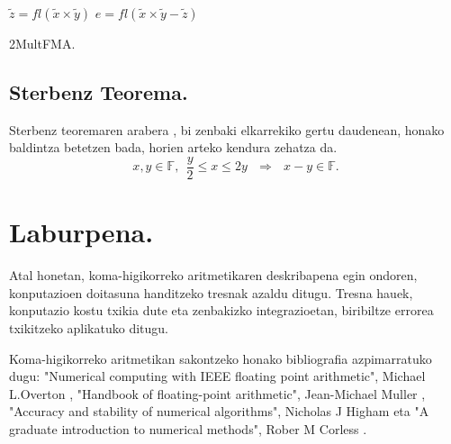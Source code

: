 \begin{algorithm}[H]
 \BlankLine
 {$\tilde{z}=fl(\tilde{x}\times\tilde{y})$\;
  $e=fl(\tilde{x}\times\tilde{y}- \tilde{z})$\;
 }
 \BlankLine
 \caption{2MultFMA.}
 \label{alg:2MultFMA}
\end{algorithm}

\subsection*{Sterbenz Teorema.}
Sterbenz teoremaren arabera \cite{Sterbenz1973}, bi zenbaki elkarrekiko  gertu daudenean, honako baldintza betetzen bada, horien arteko kendura zehatza da.
\begin{equation}
\label{eq:4311}
x,y \in \mathbb{F}, \ \ \frac{y}{2}\leq x \leq 2y \ \ \ \Rightarrow \ \ \ x-y\in \mathbb{F}.
\end{equation}


\section{Laburpena.}

Atal honetan, koma-higikorreko aritmetikaren deskribapena egin ondoren, konputazioen doitasuna handitzeko tresnak azaldu ditugu. Tresna hauek, konputazio kostu txikia dute eta zenbakizko integrazioetan, biribiltze errorea txikitzeko aplikatuko ditugu.  

Koma-higikorreko aritmetikan sakontzeko honako bibliografia azpimarratuko dugu: "Numerical computing with IEEE floating point arithmetic", Michael L.Overton \cite{Overton2001}, "Handbook of floating-point arithmetic", Jean-Michael Muller \cite{Muller2009}, "Accuracy and stability of numerical algorithms", Nicholas J Higham \cite{Higham2002} eta "A graduate introduction to numerical methods", Rober M Corless \cite{Corless2013}.

